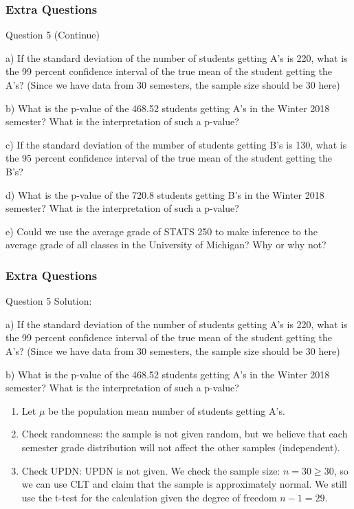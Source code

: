 \documentclass{beamer}
\begin{document}

\begin{frame}
\frametitle{Extra Questions}
\begin{block}{Question 5 (Continue)}

a) If the standard deviation of the number of students getting A's is 220, what is the 99 percent confidence interval of the true mean of the student getting the A's? (Since we have data from 30 semesters, the sample size should be 30 here)

b) What is the p-value of the 468.52 students getting A's in the Winter 2018 semester? What is the interpretation of such a p-value?

c) If the standard deviation of the number of students getting B's is 130, what is the 95 percent confidence interval of the true mean of the student getting the B's?

d) What is the p-value of the 720.8 students getting B's in the Winter 2018 semester? What is the interpretation of such a p-value?

e) Could we use the average grade of STATS 250 to make inference to the average grade of all classes in the University of Michigan? Why or why not?

\end{block}
\end{frame}


\begin{frame}
\frametitle{Extra Questions}
\begin{block}{Question 5 Solution:}

a) If the standard deviation of the number of students getting A's is 220, what is the 99 percent confidence interval of the true mean of the student getting the A's? (Since we have data from 30 semesters, the sample size should be 30 here)

b) What is the p-value of the 468.52 students getting A's in the Winter 2018 semester? What is the interpretation of such a p-value?

\begin{enumerate}

\item Let $\mu$ be the population mean number of students getting A's.

\item Check randomness: the sample is not given random, but we believe that each semester grade distribution will not affect the other samples (independent).

\item Check UPDN: UPDN is not given. We check the sample size: $n = 30 \ge 30$, so we can use CLT and claim that the sample is approximately normal. We still use the t-test for the calculation given the degree of freedom $n-1 = 29$.

\end{enumerate}
\end{block}
\end{frame}
\end{document}

